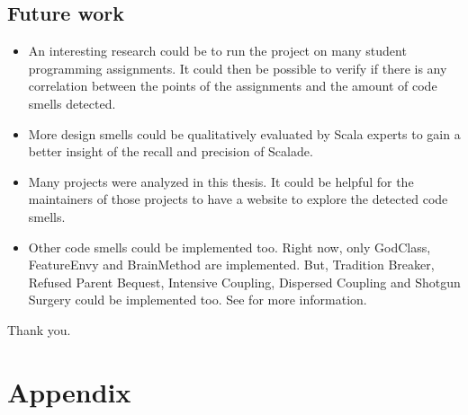 \documentclass[onecolumn]{article}
\let\oldsection\section
\renewcommand\section{\clearpage\oldsection}
\begin{document}
\subsection{Future work}
\begin{itemize}
    \item An interesting research could be to run the project on many student programming assignments. It could then be possible to verify if there is any correlation between the points of the assignments and the amount of code smells detected.
    \item More design smells could be qualitatively evaluated by Scala experts to gain a better insight of the recall and precision of Scalade.
    \item Many projects were analyzed in this thesis. It could be helpful for the maintainers of those projects to have a website to explore the detected code smells.
    \item Other code smells could be implemented too. Right now, only GodClass, FeatureEnvy and BrainMethod are implemented. But, Tradition Breaker, Refused Parent Bequest, Intensive Coupling, Dispersed Coupling and Shotgun Surgery could be implemented too. See \cite{lanza2007object} for more information.
\end{itemize}

Thank you.






\section{Appendix}
\end{document}
